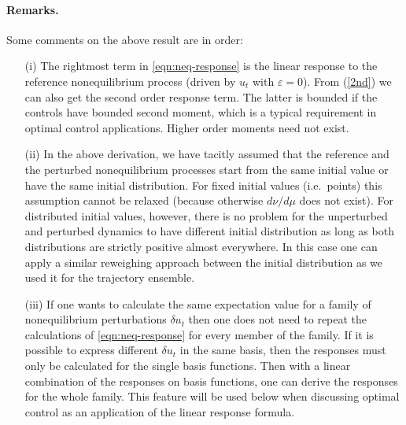 \documentclass[]{tMPH2e}
\newcommand{\eps}{\varepsilon}
\begin{document}
\paragraph*{Remarks.} Some comments on the above result are in order:
\begin{itemize}

\item[(i)] The rightmost term in \eqref{eqn:neq-response} is the linear 
  response to the reference nonequilibrium process (driven by $u_t$ with $\eps=0$).  From (\ref{2nd}) we can also get the second order response term. The latter is bounded if the controls have bounded second moment, which is a typical requirement in optimal control applications. Higher order moments need not exist. 

\item[(ii)] In the above derivation, we have tacitly assumed that the reference and the perturbed nonequilibrium processes start from the same initial value or
  have the same initial distribution. For fixed initial values (i.e.~points) this assumption cannot be relaxed (because otherwise $d\nu/d\mu$ does not exist). For distributed initial values, however, there is no problem for the unperturbed and perturbed dynamics to have different initial distribution as long as both distributions are strictly positive almost everywhere. In this case one can apply a similar reweighing approach between the initial distribution as we used it for the trajectory ensemble.  

\item[(iii)] If one wants to calculate the same expectation value for a family of nonequilibrium perturbations $\delta u_t$ then 
one does not need to repeat the calculations of \eqref{eqn:neq-response} for every member of the family. 
  If it is possible to
  express different $\delta u_t$ in the same basis, then the responses must only be
  calculated for the single basis functions. Then with a linear combination of the responses on basis functions, one can derive
  the responses for the whole family. This feature will be used below when discussing optimal control as an application of the linear response formula. 
  

\end{itemize}




\end{document}
